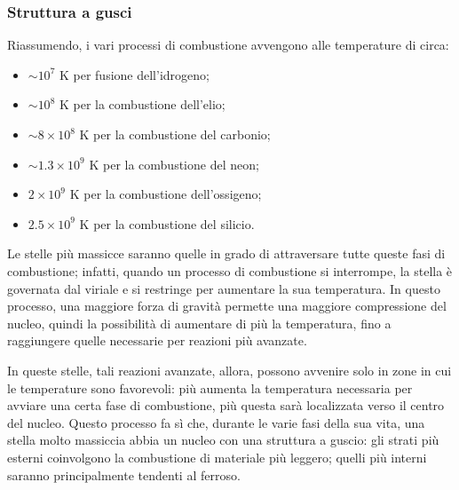 \documentclass[11pt, a4paper]{scrartcl}
\theoremstyle{style}
\theoremstyle{style1}
\numberwithin{equation}{subsection}
\begin{document}
\subsubsection{Struttura a gusci}
Riassumendo, i vari processi di combustione avvengono alle temperature di circa:
\begin{itemize}
	\item $\sim 10^7$ K per fusione dell'idrogeno;
	\item $\sim 10^8$ K per la combustione dell'elio;
	\item $\sim 8 \times 10^ 8 $ K per la combustione del carbonio;
	\item $\sim 1.3 \times 10^9$ K per la combustione del neon;
	\item $2 \times 10^9$ K per la combustione dell'ossigeno;
	\item $2.5 \times 10^9$ K per la combustione del silicio.
\end{itemize}
Le stelle pi\`u massicce saranno quelle in grado di attraversare tutte queste fasi di combustione; infatti, quando un processo di combustione si interrompe, la stella \`e governata dal viriale e si restringe per aumentare la sua temperatura. 
In questo processo, una maggiore forza di gravit\`a permette una maggiore compressione del nucleo, quindi la possibilit\`a di aumentare di pi\`u la temperatura, fino a raggiungere quelle necessarie per reazioni pi\`u avanzate.

In queste stelle, tali reazioni avanzate, allora, possono avvenire solo in zone in cui le temperature sono favorevoli: pi\`u aumenta la temperatura necessaria per avviare una certa fase di combustione, pi\`u questa sar\`a localizzata verso il centro del nucleo.
Questo processo fa s\`i che, durante le varie fasi della sua vita, una stella molto massiccia abbia un nucleo con una struttura a guscio: gli strati pi\`u esterni coinvolgono la combustione di materiale pi\`u leggero; quelli pi\`u interni saranno principalmente tendenti al ferroso.
\end{document}

